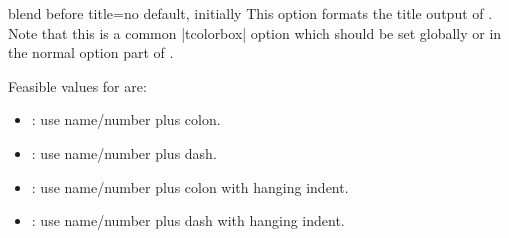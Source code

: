 \clearpage
\begin{docTcbKey}[][doc new=2015-03-13]{blend before title}{=}{no default, initially }
  This option formats the title output of .
  Note that this is a common |tcolorbox| option which should be set
  globally or in the normal option part of .

Feasible values for  are:
\begin{itemize}
\item{}: use name/number plus colon.
\item{}: use name/number plus dash.
\item{}: use name/number plus colon with hanging indent.
\item{}: use name/number plus dash with hanging indent.
\end{itemize}

{\tcbusetemp}
\end{docTcbKey}

